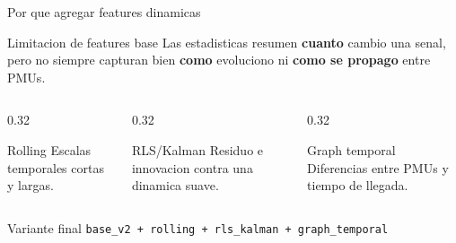 \documentclass[10pt,aspectratio=169]{beamer}
\newcommand{\code}[1]{\texttt{\footnotesize #1}}
\begin{document}
\begin{frame}{Por que agregar features dinamicas}
\small
\begin{block}{Limitacion de features base}
Las estadisticas resumen \textbf{cuanto} cambio una senal, pero no siempre capturan bien \textbf{como} evoluciono ni \textbf{como se propago} entre PMUs.
\end{block}
\begin{columns}[T,totalwidth=\textwidth]
\begin{column}{0.32\textwidth}
\begin{exampleblock}{Rolling}
Escalas temporales cortas y largas.
\end{exampleblock}
\end{column}
\begin{column}{0.32\textwidth}
\begin{exampleblock}{RLS/Kalman}
Residuo e innovacion contra una dinamica suave.
\end{exampleblock}
\end{column}
\begin{column}{0.32\textwidth}
\begin{exampleblock}{Graph temporal}
Diferencias entre PMUs y tiempo de llegada.
\end{exampleblock}
\end{column}
\end{columns}
\vspace{2mm}
\begin{alertblock}{Variante final}
\code{base\_v2 + rolling + rls\_kalman + graph\_temporal}
\end{alertblock}
\end{frame}
\end{document}
